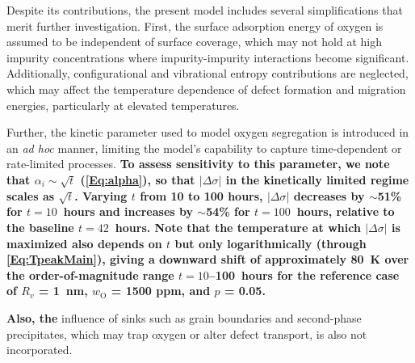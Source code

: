 \documentclass[preprint,12pt,sort&compress]{elsarticle}
\newcommand{\?}{\stackrel{?}{=}}
\providecommand{\DIFaddtex}[1]{{\bf #1}} %
\providecommand{\DIFdeltex}[1]{} %
\providecommand{\DIFaddbegin}{\protect\color{blue}} %
\providecommand{\DIFaddend}{\protect\color{black}} %
\providecommand{\DIFdelbegin}{\protect\color{red}} %
\providecommand{\DIFdelend}{\protect\color{black}} %
\providecommand{\DIFadd}[1]{\texorpdfstring{\DIFaddtex{#1}}{#1}} %
\providecommand{\DIFdel}[1]{\texorpdfstring{\DIFdeltex{#1}}{}} %
\newcommand{\DIFscaledelfig}{0.5}
\newlength{\DIFdelgraphicswidth} %
\newlength{\DIFdelgraphicsheight} %
\newcommand{\DIFaddincludegraphics}[2][]{{\color{blue}\fbox{\DIFOincludegraphics[#1]{#2}}}} %
\newcommand{\DIFdelincludegraphics}[2][]{%
\sbox{\DIFdelgraphicsbox}{\DIFOincludegraphics[#1]{#2}}%
\settoboxwidth{\DIFdelgraphicswidth}{\DIFdelgraphicsbox} %
\settoboxtotalheight{\DIFdelgraphicsheight}{\DIFdelgraphicsbox} %
\scalebox{\DIFscaledelfig}{%
\parbox[b]{\DIFdelgraphicswidth}{\usebox{\DIFdelgraphicsbox}\\[-\baselineskip] \rule{\DIFdelgraphicswidth}{0em}}\llap{\resizebox{\DIFdelgraphicswidth}{\DIFdelgraphicsheight}{%
\setlength{\unitlength}{\DIFdelgraphicswidth}%
\begin{picture}(1,1)%
\thicklines\linethickness{2pt} %
{\color[rgb]{1,0,0}\put(0,0){\framebox(1,1){}}}%
{\color[rgb]{1,0,0}\put(0,0){\line( 1,1){1}}}%
{\color[rgb]{1,0,0}\put(0,1){\line(1,-1){1}}}%
\end{picture}%
}\hspace*{3pt}}} %
} %
\DeclareRobustCommand{\DIFaddbegin}{\DIFOaddbegin \let\includegraphics\DIFaddincludegraphics} %
\DeclareRobustCommand{\DIFaddend}{\DIFOaddend \let\includegraphics\DIFOincludegraphics} %
\DeclareRobustCommand{\DIFdelbegin}{\DIFOdelbegin \let\includegraphics\DIFdelincludegraphics} %
\DeclareRobustCommand{\DIFdelend}{\DIFOaddend \let\includegraphics\DIFOincludegraphics} %
\begin{document}
Despite its contributions, the present model includes several simplifications that merit further investigation. First, the surface adsorption energy of oxygen is assumed to be independent of surface coverage, which may not hold at high impurity concentrations where impurity-impurity interactions become significant. Additionally, configurational and vibrational entropy contributions are neglected, which may affect the temperature dependence of defect formation and migration energies, particularly at elevated temperatures.
\DIFaddbegin 

\DIFaddend Further, the kinetic parameter used to model oxygen segregation is introduced in an \textit{ad hoc} manner, limiting the model's capability to capture time-dependent or rate-limited processes. \DIFdelbegin \DIFdel{Finally, the }\DIFdelend \DIFaddbegin \DIFadd{To assess sensitivity to this parameter, we note that $\alpha_i \sim \sqrt{t}$ (\cref{Eq:alpha}), so that $|\Delta \sigma|$ in the kinetically limited regime scales as $\sqrt{t}$. Varying $t$ from 10 to 100 hours, $|\Delta \sigma|$ decreases by $\sim$51\% for $t = 10$~hours and increases by $\sim$54\% for $t = 100$~hours, relative to the baseline $t = 42$~hours. Note that the temperature at which $|\Delta \sigma|$ is maximized also depends on $t$ but only logarithmically (through \cref{Eq:TpeakMain}), giving a downward shift of approximately 80~K over the order-of-magnitude range $t = 10$--100~hours for the reference case of $R_v$ = 1~nm, $w_\text{O}$ = 1500 ppm, and $p$ = 0.05.
}

\DIFadd{Also, the }\DIFaddend influence of sinks such as grain boundaries and second-phase precipitates, which may trap oxygen or alter defect transport, is also not incorporated.
\end{document}
